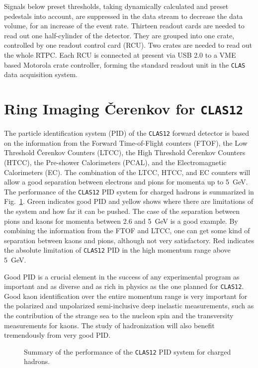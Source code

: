 Signals below preset thresholds, taking dynamically calculated and preset 
pedestals into account, are suppressed in the data stream to decrease the 
data volume, for an increase of the event rate. Thirteen readout cards are 
needed to read out one half-cylinder of the detector.  They are grouped 
into one crate, controlled by one readout control card (RCU).  Two crates 
are needed to read out the whole RTPC.  Each RCU is connected at present 
via USB 2.0 to a VME based Motorola crate controller, forming the standard 
readout unit in the {\tt CLAS} data acquisition system.

\section{Ring Imaging {\v C}erenkov for {\tt CLAS12}}

The particle identification system (PID) of the {\tt CLAS12} forward detector 
is based on the information from the Forward Time-of-Flight counters (FTOF), 
the Low Threshold {\v C}erenkov Counters (LTCC), the High Threshold 
{\v C}erenkov Counters (HTCC), the Pre-shower Calorimeters (PCAL), and the 
Electromagnetic Calorimeters (EC). The combination of the LTCC, HTCC, and EC 
counters will allow a good separation between electrons and pions for momenta 
up to 5~GeV.  The performance of the {\tt CLAS12} PID system for charged 
hadrons is summarized in Fig.~\ref{fig:pid}.  Green indicates good PID and
yellow shows where there are limitations of the system and how far it can be 
pushed. The case of the separation between pions and kaons for momenta  
between 2.6 and 5~GeV is a good example.  By combining the information from 
the FTOF and LTCC, one can get some kind of separation between kaons and 
pions, although not very satisfactory.  Red indicates the absolute limitation 
of {\tt CLAS12} PID in the high momentum range above 5~GeV.

Good PID is a crucial element in the success of any experimental program as 
important and as diverse and as rich in physics as the one planned for 
{\tt CLAS12}.  Good kaon identification over the entire momentum range is 
very important for the polarized and unpolarized semi-inclusive deep inelastic
measurements, such as the contribution of the strange sea to the nucleon spin 
and the transversity measurements for kaons. The study of hadronization will 
also benefit tremendously from very good PID.

\begin{figure}
\epsfxsize=12cm
\epsfysize=8cm
\centerline{}
\vspace{-0.3 cm}
\caption{\small{Summary of the performance of the {\tt CLAS12} PID system 
for charged hadrons.}}
\label{fig:pid}
\end{figure}

